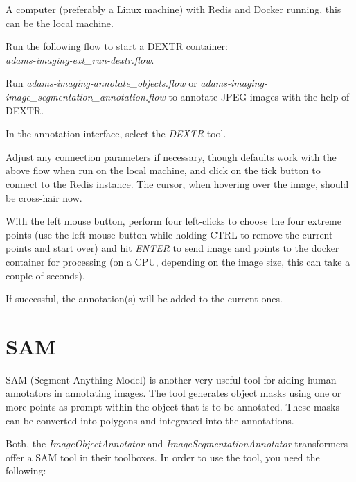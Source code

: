 \documentclass[a4paper]{book}
\begin{document}
\begin{tight_itemize}
  \item A computer (preferably a Linux machine) with Redis\cite{redis} and Docker\cite{docker} running,
  this can be the local machine.
  \item Run the following flow to start a DEXTR container: \\
  \textit{adams-imaging-ext\_run-dextr.flow}.
  \item Run \textit{adams-imaging-annotate\_objects.flow} or \textit{adams-imaging-image_segmentation_annotation.flow}
  to annotate JPEG images with the help of DEXTR.
  \begin{tight_itemize}
    \item In the annotation interface, select the \textit{DEXTR} tool.
    \item Adjust any connection parameters if necessary, though defaults work with the above flow when run on the
    local machine, and click on the tick button to connect to the Redis instance. The cursor, when hovering over
    the image, should be cross-hair now.
    \item With the left mouse button, perform four left-clicks to choose the four extreme points (use the left mouse
    button while holding CTRL to remove the current points and start over) and hit \textit{ENTER} to send image and
    points to the docker container for processing (on a CPU, depending on the image size, this can take a couple of seconds).
    \item If successful, the annotation(s) will be added to the current ones.
  \end{tight_itemize}
\end{tight_itemize}


\newpage
\section{SAM}
SAM\cite{sam} (Segment Anything Model) is another very useful tool for aiding human annotators in
annotating images. The tool generates object masks using one or more points as prompt
within the object that is to be annotated. These masks can be converted into polygons
and integrated into the annotations.

Both, the \textit{ImageObjectAnnotator} and \textit{ImageSegmentationAnnotator} transformers offer a SAM
tool in their toolboxes. In order to use the tool, you need the following:
\end{document}
